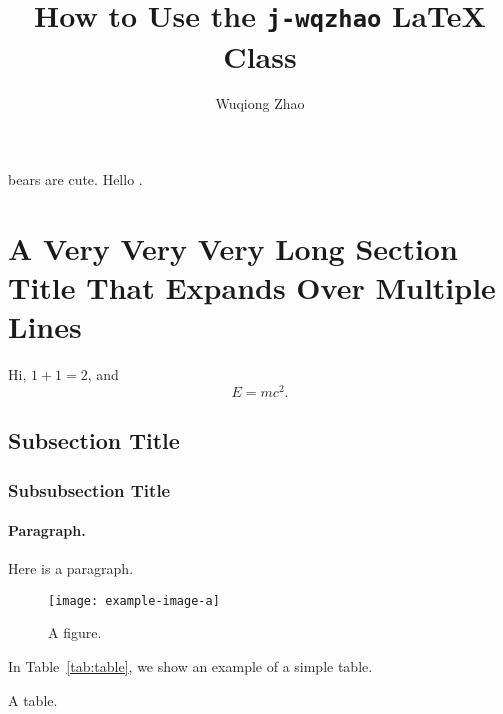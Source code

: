 \documentclass{j-wqzhao}
\title{How to Use the \texttt{j-wqzhao} \LaTeX{} Class}
\author{Wuqiong Zhao \orcidlink{0000-0002-9550-7423}}
\affiliation{Southeast University, Nanjing, China}
\begin{document}
  \maketitle

   bears are cute. \lipsum[1]
  Hello \cite{zhao2023ompl}.

  \section{A Very Very Very Long Section Title That Expands Over Multiple Lines}

  Hi, $1+1=2$, and
  \begin{equation}
    E=mc^2.
  \end{equation}

    \subsection{Subsection Title}

      \subsubsection{Subsubsection Title}

        \paragraph{Paragraph.} Here is a paragraph.

  \begin{figure}[htbp]
    \texttt{[image: example-image-a]}
    \caption{A figure.}
  \end{figure}

  In Table~\ref{tab:table}, we show an example of a simple table.
  \begin{table}[htbp]
    \caption{A table.}
    \label{tab:table}
  \end{table}

  \lipsum

  \printbibliography
\end{document}
